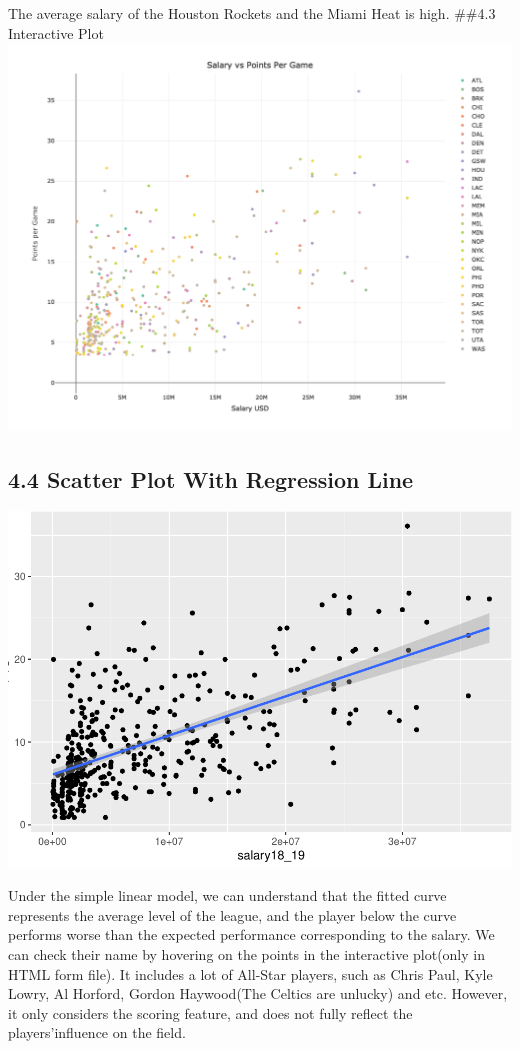 \documentclass[]{article}
\begin{document}
The average salary of the Houston Rockets and the Miami Heat is high.
\#\#4.3 Interactive Plot
\includegraphics{Final_Report_files/figure-latex/unnamed-chunk-15-1.png}

\subsection{4.4 Scatter Plot With Regression
Line}\label{scatter-plot-with-regression-line}

\includegraphics{Final_Report_files/figure-latex/unnamed-chunk-16-1.pdf}

Under the simple linear model, we can understand that the fitted curve
represents the average level of the league, and the player below the
curve performs worse than the expected performance corresponding to the
salary. We can check their name by hovering on the points in the
interactive plot(only in HTML form file). It includes a lot of All-Star
players, such as Chris Paul, Kyle Lowry, Al Horford, Gordon Haywood(The
Celtics are unlucky) and etc. However, it only considers the scoring
feature, and does not fully reflect the players'influence on the field.
\end{document}
